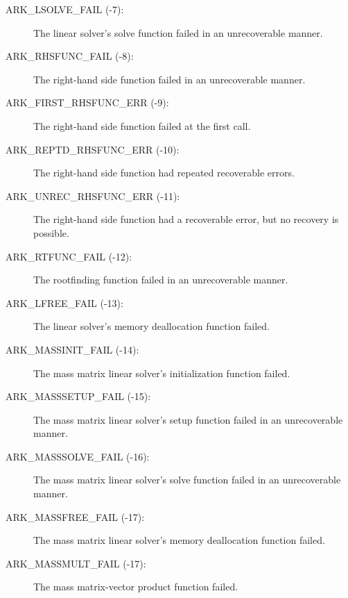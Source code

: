 \documentclass[letterpaper,10pt,english]{sphinxmanual}
\begin{document}
\begin{description}
\item[{ARK\_LSOLVE\_FAIL  (-7):}] \leavevmode
The linear solver's solve function failed in
an unrecoverable manner.

\item[{ARK\_RHSFUNC\_FAIL  (-8):}] \leavevmode
The right-hand side function failed in an
unrecoverable manner.

\item[{ARK\_FIRST\_RHSFUNC\_ERR  (-9):}] \leavevmode
The right-hand side function failed
at the first call.

\item[{ARK\_REPTD\_RHSFUNC\_ERR  (-10):}] \leavevmode
The right-hand side function had
repeated recoverable errors.

\item[{ARK\_UNREC\_RHSFUNC\_ERR  (-11):}] \leavevmode
The right-hand side function had a
recoverable error, but no recovery is possible.

\item[{ARK\_RTFUNC\_FAIL  (-12):}] \leavevmode
The rootfinding function failed in an
unrecoverable manner.

\item[{ARK\_LFREE\_FAIL  (-13):}] \leavevmode
The linear solver's memory deallocation function failed.

\item[{ARK\_MASSINIT\_FAIL  (-14):}] \leavevmode
The mass matrix linear solver's initialization function failed.

\item[{ARK\_MASSSETUP\_FAIL  (-15):}] \leavevmode
The mass matrix linear solver's setup function failed in
an unrecoverable manner.

\item[{ARK\_MASSSOLVE\_FAIL  (-16):}] \leavevmode
The mass matrix linear solver's solve function failed in
an unrecoverable manner.

\item[{ARK\_MASSFREE\_FAIL  (-17):}] \leavevmode
The mass matrix linear solver's memory deallocation function failed.

\item[{ARK\_MASSMULT\_FAIL  (-17):}] \leavevmode
The mass matrix-vector product function failed.


\end{description}
\end{document}
